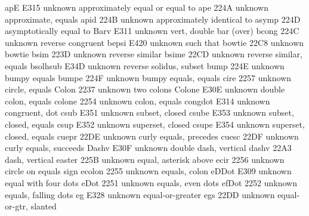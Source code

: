 %
%

 apE                   E315 {unknown} approximately equal or equal to
 ape                   224A {unknown} approximate, equals
 apid                  224B {unknown} approximately identical to
 asymp                 224D {\asymp} asymptotically equal to
 Barv                  E311 {unknown} vert, double bar (over)
 bcong                 224C {unknown} reverse congruent
 bepsi                 E420 {unknown} such that
 bowtie                22C8 {unknown} bowtie
 bsim                  223D {unknown} reverse similar
 bsime                 22CD {unknown} reverse similar, equals
 bsolhsub              E34D {unknown} reverse solidus, subset
 bump                  224E {unknown} bumpy equals
 bumpe                 224F {unknown} bumpy equals, equals
 cire                  2257 {unknown} circle, equals
 Colon                 2237 {unknown} two colons
 Colone                E30E {unknown} double colon, equals
 colone                2254 {unknown} colon, equals
 congdot               E314 {unknown} congruent, dot
 csub                  E351 {unknown} subset, closed
 csube                 E353 {unknown} subset, closed, equals
 csup                  E352 {unknown} superset, closed
 csupe                 E354 {unknown} superset, closed, equals
 cuepr                 22DE {unknown} curly equals, precedes
 cuesc                 22DF {unknown} curly equals, succeeds
 Dashv                 E30F {unknown} double dash, vertical
 dashv                 22A3 {\dashv} dash, vertical
 easter                225B {unknown} equal, asterisk above
 ecir                  2256 {unknown} circle on equals sign
 ecolon                2255 {unknown} equals, colon
 eDDot                 E309 {unknown} equal with four dots
 eDot                  2251 {unknown} equals, even dots
 efDot                 2252 {unknown} equals, falling dots
 eg                    E328 {unknown} equal-or-greater
 egs                   22DD {unknown} equal-or-gtr, slanted
